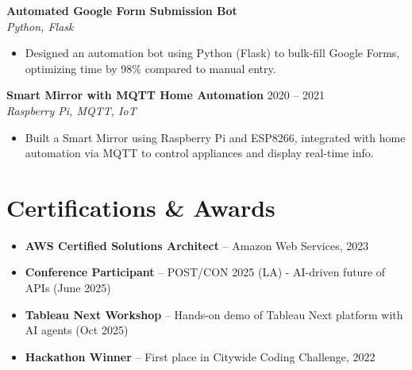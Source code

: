 \documentclass[letterpaper,10pt]{article}
\begin{document}
\textbf{Automated Google Form Submission Bot} \\
\textit{Python, Flask}
\begin{itemize} \itemsep -2pt
    \item Designed an automation bot using Python (Flask) to bulk-fill Google Forms, optimizing time by 98\% compared to manual entry.
\end{itemize}

\textbf{Smart Mirror with MQTT Home Automation} \hfill 2020 -- 2021 \\
\textit{Raspberry Pi, MQTT, IoT}
\begin{itemize} \itemsep -2pt
    \item Built a Smart Mirror using Raspberry Pi and ESP8266, integrated with home automation via MQTT to control appliances and display real-time info.
\end{itemize}

\section*{Certifications \& Awards}
\begin{itemize} \itemsep -2pt
    \item \textbf{AWS Certified Solutions Architect} -- Amazon Web Services, 2023
    \item \textbf{Conference Participant} -- POST/CON 2025 (LA) - AI-driven future of APIs (June 2025)
    \item \textbf{Tableau Next Workshop} -- Hands-on demo of Tableau Next platform with AI agents (Oct 2025)
    \item \textbf{Hackathon Winner} -- First place in Citywide Coding Challenge, 2022
\end{itemize}
\end{document}
